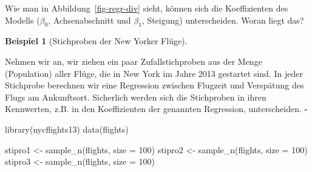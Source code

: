 \documentclass[
  ngerman,
  letterpaper,
  twoside,
  open=any]{scrbook}
\newenvironment{Shaded}{\begin{snugshade}}{\end{snugshade}}
\newcommand{\AttributeTok}[1]{\textcolor[rgb]{0.40,0.45,0.13}{#1}}
\newcommand{\DecValTok}[1]{\textcolor[rgb]{0.68,0.00,0.00}{#1}}
\newcommand{\FunctionTok}[1]{\textcolor[rgb]{0.28,0.35,0.67}{#1}}
\newcommand{\NormalTok}[1]{\textcolor[rgb]{0.00,0.23,0.31}{#1}}
\newcommand{\OtherTok}[1]{\textcolor[rgb]{0.00,0.23,0.31}{#1}}
\theoremstyle{definition}
\newtheorem{example}{Beispiel}[chapter]
\theoremstyle{plain}
\theoremstyle{definition}
\theoremstyle{definition}
\theoremstyle{remark}
\begin{document}
Wie man in Abbildung~\ref{fig-regr-div} sieht, können sich die
Koeffizienten des Modells (\(\beta_0\), Achsenabschnitt und \(\beta_1\),
Steigung) unterscheiden. Woran liegt das?

\begin{example}[Stichproben der New Yorker
Flüge]\protect\hypertarget{exm-flights}{}\label{exm-flights}

Nehmen wir an, wir ziehen ein paar Zufallstichproben aus der Menge
(Population) aller Flüge, die in New York im Jahre 2013 gestartet sind.
In jeder Stichprobe berechnen wir eine Regression zwischen Flugzeit und
Verspätung des Flugs am Ankunftsort. Sicherlich werden sich die
Stichproben in ihren Kennwerten, z.B. in den Koeffizienten der genannten
Regression, unterscheiden. \(\square\)

\end{example}

\begin{Shaded}
\begin{Highlighting}[]
\FunctionTok{library}\NormalTok{(nycflights13)}
\FunctionTok{data}\NormalTok{(flights)}

\NormalTok{stipro1 }\OtherTok{\textless{}{-}} \FunctionTok{sample\_n}\NormalTok{(flights, }\AttributeTok{size =} \DecValTok{100}\NormalTok{)}
\NormalTok{stipro2 }\OtherTok{\textless{}{-}} \FunctionTok{sample\_n}\NormalTok{(flights, }\AttributeTok{size =} \DecValTok{100}\NormalTok{)}
\NormalTok{stipro3 }\OtherTok{\textless{}{-}} \FunctionTok{sample\_n}\NormalTok{(flights, }\AttributeTok{size =} \DecValTok{100}\NormalTok{)}
\end{Highlighting}
\end{Shaded}
\end{document}
